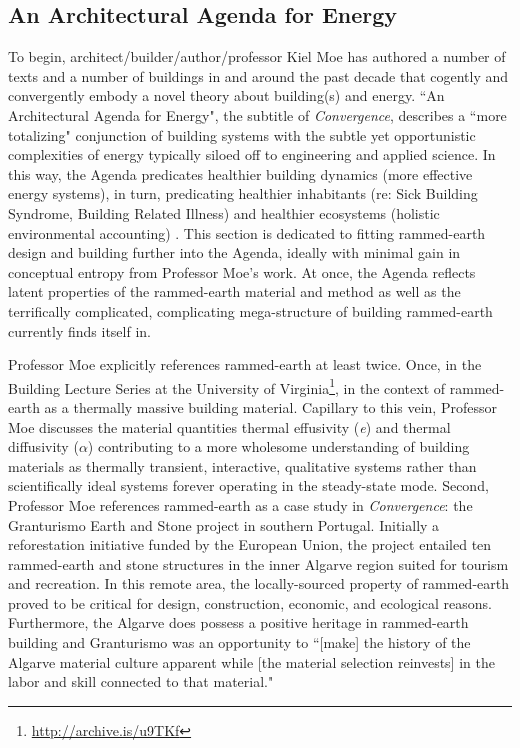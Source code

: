 \subsection{An Architectural Agenda for Energy}

To begin, architect/builder/author/professor Kiel Moe has authored a number of texts and a number of buildings in and around the past decade that cogently and convergently embody a novel theory about building(s) and energy. ``An Architectural Agenda for Energy", the subtitle of \textit{Convergence}, describes a ``more totalizing" conjunction of building systems with the subtle yet opportunistic complexities of energy typically siloed off to engineering and applied science. In this way, the Agenda predicates healthier building dynamics (more effective energy systems), in turn, predicating healthier inhabitants (re: Sick Building Syndrome, Building Related Illness) and healthier ecosystems (holistic environmental accounting) \cite{MOECONVERGENCE}. This section is dedicated to fitting rammed-earth design and building further into the Agenda, ideally with minimal gain in conceptual entropy from Professor Moe's work. At once, the Agenda reflects latent properties of the rammed-earth material and method as well as the terrifically complicated, complicating mega-structure of building rammed-earth currently finds itself in.

Professor Moe explicitly references rammed-earth at least twice. Once, in the Building Lecture Series at the University of Virginia\footnote{\url{http://archive.is/u9TKf}}, in the context of rammed-earth as a thermally massive building material. Capillary to this vein, Professor Moe discusses the material quantities thermal effusivity (\textit{e}) and thermal diffusivity ($\alpha$) contributing to a more wholesome understanding of building materials as thermally transient, interactive, qualitative systems rather than scientifically ideal systems forever operating in the steady-state mode. Second, Professor Moe references rammed-earth as a case study in \textit{Convergence}: the Granturismo Earth and Stone project in southern Portugal. Initially a reforestation initiative funded by the European Union, the project entailed ten rammed-earth and stone structures in the inner Algarve region suited for tourism and recreation. In this remote area, the locally-sourced property of rammed-earth proved to be critical for design, construction, economic, and ecological reasons. Furthermore, the Algarve does possess a positive heritage in rammed-earth building and Granturismo was an opportunity to ``[make] the history of the Algarve material culture apparent while [the material selection reinvests] in the labor and skill connected to that material." \cite{MOECONVERGENCE}

